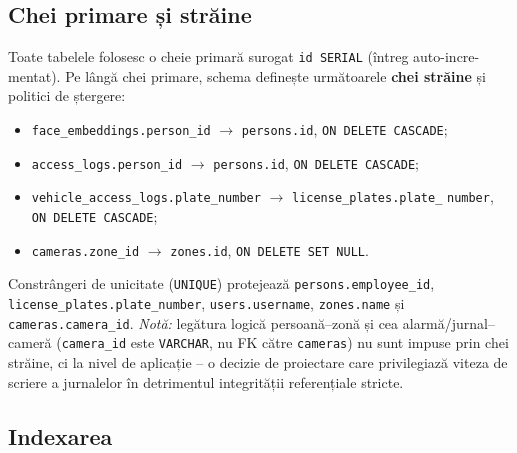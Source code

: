 \documentclass[../../main.tex]{subfiles}
\begin{document}
\subsection{Chei primare și străine}

Toate tabelele folosesc o cheie primară surogat \texttt{id SERIAL} (întreg auto-incre-mentat). Pe lângă chei primare, schema definește următoarele \textbf{chei străine} și politici de ștergere:
\begin{itemize}
    \item \texttt{face\_embeddings.person\_id} $\rightarrow$ \texttt{persons.id}, \texttt{ON DELETE CASCADE};
    \item \texttt{access\_logs.person\_id} $\rightarrow$ \texttt{persons.id}, \texttt{ON DELETE CASCADE};
    \item \texttt{vehicle\_access\_logs.plate\_number} $\rightarrow$ \texttt{license\_plates.plate\_} \linebreak \texttt{number}, \texttt{ON DELETE CASCADE};
    \item \texttt{cameras.zone\_id} $\rightarrow$ \texttt{zones.id}, \texttt{ON DELETE SET NULL}.
\end{itemize}
Constrângeri de unicitate (\texttt{UNIQUE}) protejează \texttt{persons.employee\_id}, \linebreak \texttt{license\_plates.plate\_number}, \texttt{users.username}, \texttt{zones.name} și \texttt{cameras.\linebreak camera\_id}. \emph{Notă:} legătura logică persoană--zonă și cea alarmă/jurnal--cameră (\texttt{camera\_id} este \texttt{VARCHAR}, nu FK către \texttt{cameras}) nu sunt impuse prin chei străine, ci la nivel de aplicație -- o decizie de proiectare care privilegiază viteza de scriere a jurnalelor în detrimentul integrității referențiale stricte.

\subsection{Indexarea}
\end{document}
